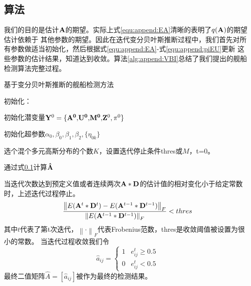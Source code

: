 \subsection{算法}
我们的目的是估计$\bf{A}$的期望。实际上式\ref{equ:append:EA}清晰的表明了$q(\bf{A})$的期望估计依赖于
其他参数的期望。因此在迭代变分贝叶斯推断过程中，我们首先对所有参数做适当初始化，然后根据式\ref{equ:append:EA}-式\ref{equ:append:piEU}更新
这些参数的估计结果，知道达到收敛。算法\ref{alg:append:VBI}总结了我们提出的舰船检测算法完整过程。

\begin{algorithm}[t]
  \caption{基于变分贝叶斯推断的舰船检测方法}
  \label{alg:append:VBI}
  \BlankLine
  初始化：

  初始化潜变量${{\bf{Y}}^0} = \{ {{\bf{A}}^{\bf{0}}}{\bf{,}}{{\bf{U}}^{\bf{0}}}{\bf{,}}{{\bf{M}}^{\bf{0}}}{\bf{,}}{{\bf{Z}}^0},{\pi ^0}\}$

  初始化超参数${\alpha _0},{\beta _0},{\beta _1},{\beta _2},\{ {\eta _{0k}}\}$

  选个混个多元高斯分布的个数$K$，设置迭代停止条件thres或$M$，t=0。


    通过式\ref{}计算${\bf{\hat A}}$
 \end{algorithm}

 当迭代次数达到预定义值或者连续两次$\bf{A}*\bf{D}$的估计值的相对变化小于给定常数时，上述迭代过程停止。
 \begin{equation}
    \label{equ:append:thresstop}
     \frac{{{{\left\| {E({{\bf{A}}^t}*{{\bf{D}}^t}) - E({{\bf{A}}^{t - 1}}*{{\bf{D}}^{t - 1}})} \right\|}_F}}}{{{{\left\| {E({{\bf{A}}^{t - 1}}*{{\bf{D}}^{t - 1}})} \right\|}_F}}} < thres
 \end{equation}
 其中$t$代表了第t次迭代，${\left\|  \cdot  \right\|_F}$代表Frobenius范数，thres是收敛阈值被设置为很小的常数。
 当迭代过程收敛我们令
 \begin{equation}
        {\hat a_{ij}} = \left\{ {\begin{array}{*{20}{c}}
        1&{e_{ij}^t \ge 0.5}\\
        0&{e_{ij}^t < 0.5}
        \end{array}} \right.
 \end{equation}
 最终二值矩阵$\hat A = [{\hat a_{ij}}]$被作为最终的检测结果。
